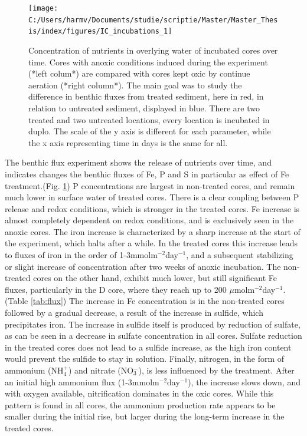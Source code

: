 \documentclass[a4paper,11pt]{article}
\begin{document}
\begin{figure}

{\centering \texttt{[image: C:/Users/harmv/Documents/studie/scriptie/Master/Master\_Thesis/index/figures/IC\_incubations\_1]} 

}

\caption{Concentration of nutrients in overlying water of incubated cores over time. Cores with anoxic conditions induced during the experiment (*left colum*) are compared with cores kept oxic by continue aeration (*right column*). The main goal was to study the difference in benthic fluxes from treated sediment, here in red, in relation to untreated sediment, displayed in blue. There are two treated and two untreated locations,  every location is incubated in duplo. The scale of the y axis is different for each parameter, while the x axis representing time in days is the same for all.}\label{fig:incubations}
\end{figure}
The benthic flux experiment shows the release of nutrients over time, and indicates changes the benthic fluxes of Fe, P and S in particular as effect of Fe treatment.(Fig. \ref{fig:incubations}) P concentrations are largest in non-treated cores, and remain much lower in surface water of treated cores. There is a clear coupling between P release and redox conditions, which is stronger in the treated cores. Fe increase is almost completely dependent on redox conditions, and is exclusively seen in the anoxic cores. The iron increase is characterized by a sharp increase at the start of the experiment, which halts after a while. In the treated cores this increase leads to fluxes of iron in the order of 1-3mmolm\(^{-2}\)day\(^{-1}\), and a subsequent stabilizing or slight increase of concentration after two weeks of anoxic incubation. The non-treated cores on the other hand, exhibit much lower, but still significant Fe fluxes, particularly in the D core, where they reach up to 200 \(\mu\)molm\(^{-2}\)day\(^{-1}\). (Table \ref{tab:flux}) The increase in Fe concentration is in the non-treated cores followed by a gradual decrease, a result of the increase in sulfide, which precipitates iron. The increase in sulfide itself is produced by reduction of sulfate, as can be seen in a decrease in sulfate concentration in all cores. Sulfate reduction in the treated cores does not lead to a sulfide increase, as the high iron content would prevent the sulfide to stay in solution. Finally, nitrogen, in the form of ammonium (NH\(_4^+\)) and nitrate (NO\(_3^-\)), is less influenced by the treatment. After an initial high ammonium flux (1-3mmolm\(^{-2}\)day\(^{-1}\)), the increase slows down, and with oxygen available, nitrification dominates in the oxic cores. While this pattern is found in all cores, the ammonium production rate appears to be smaller during the initial rise, but larger during the long-term increase in the treated cores.
\end{document}
